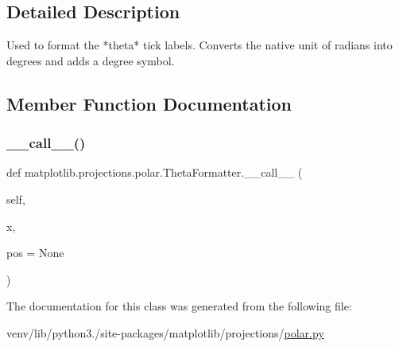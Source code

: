 \subsection{Detailed Description}
\begin{DoxyVerb}Used to format the *theta* tick labels.  Converts the native
unit of radians into degrees and adds a degree symbol.
\end{DoxyVerb}
 

\subsection{Member Function Documentation}
\mbox{\label{classmatplotlib_1_1projections_1_1polar_1_1ThetaFormatter_a1c471f30d3e265087849d64cf0dbf4d2}} 
\subsubsection{\texorpdfstring{\+\_\+\+\_\+call\+\_\+\+\_\+()}{\_\_call\_\_()}}
{\footnotesize\ttfamily def matplotlib.\+projections.\+polar.\+Theta\+Formatter.\+\_\+\+\_\+call\+\_\+\+\_\+ (\begin{DoxyParamCaption}\item[{}]{self,  }\item[{}]{x,  }\item[{}]{pos = {\ttfamily None} }\end{DoxyParamCaption})}



The documentation for this class was generated from the following file\+:\begin{DoxyCompactItemize}
\item 
venv/lib/python3./site-\/packages/matplotlib/projections/\hyperlink{polar_8py}{polar.\+py}\end{DoxyCompactItemize}
